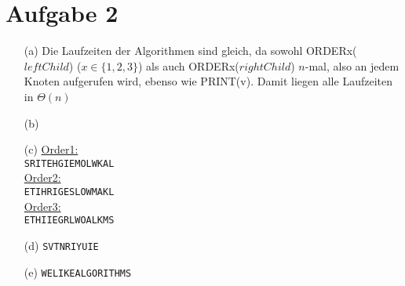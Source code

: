 \documentclass{article}
\begin{document}
\section{Aufgabe 2}
\begin{enumerate}
\item[(a)]
Die Laufzeiten der Algorithmen sind gleich, da sowohl ORDERx($leftChild$) 
($x \in \{1,2,3\} $) als auch ORDERx($rightChild$) $n$-mal, also an jedem 
Knoten aufgerufen wird, ebenso wie PRINT(v). Damit liegen alle 
Laufzeiten in $\Theta(n)$
\item[(b)]
\item[(c)]
\underline{Order1:}\\
\texttt{SRITEHGIEMOLWKAL}\\

\underline{Order2:}\\
\texttt{ETIHRIGESLOWMAKL}\\

\underline{Order3:}\\
\texttt{ETHIIEGRLWOALKMS}\\

\item[(d)]
\texttt{SVTNRIYUIE}
\item[(e)]
\texttt{WELIKEALGORITHMS}
\end{enumerate}
\end{document}
